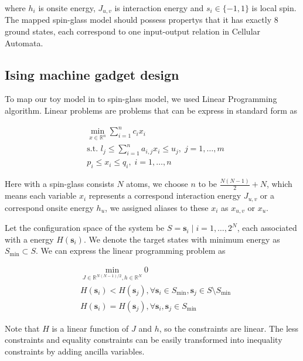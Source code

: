 \documentclass[twocolumn,superscriptaddress,english,showpacs,longbibliography]{revtex4-2}
\begin{document}
where $h_i$ is onsite energy, $J_{u,v}$ is interaction energy and
$s_i \in \{-1, 1\}$ is local spin. The mapped spin-glass model should
possess propertys that it has exactly 8 ground states, each correspond
to one input-output relation in Cellular Automata.

\subsection{Ising machine gadget design}\label{sec:gadget-design}
To map our toy model in  to
spin-glass model, we used Linear Programming algorithm.
Linear problems are problems that can be express in standard form as

\begin{equation}
    \begin{split}
        &\min_{x \in \mathbb{R}^n} \sum_{i=1}^n c_ix_i\\
        &\text{s.t. } l_j \leq \sum_{i=1}^n a_{i,j}x_i \leq u_j, \; j=1,\ldots,m\\
        &p_i \leq x_i \leq q_i, \; i=1,\ldots, n
    \end{split}
\end{equation}

Here with a spin-glass consists $N$ atoms, we choose $n$ to be
$\frac{N(N-1)}{2} + N$, which means each variable $x_i$ represents a
correspond interaction energy $J_{u, v}$ or a correspond onsite energy
$h_u$, we assigned aliases to these $x_i$ as $x_{u,v}$ or
$x_{u}$.

Let the configuration space of the system be
$S = {\mathbf s_i\mid i=1,\ldots, 2^N}$, each associated with a
energy $H(\mathbf s_i)$. We denote the target states with minimum
energy as $S_{\text{min}} \subset S$. We can express the linear
programming problem as

\begin{equation}
    \begin{split}
        &\min_{J \in \mathbb{R}^{N(N{-}1)/2}, h\in \mathbb{R}^N} 0\\
        &H(\mathbf s_i) < H(\mathbf s_j), \forall \mathbf s_i \in S_{\text{min}}, \mathbf s_j \in S \setminus S_{\text{min}}\\
        &H(\mathbf s_i) = H(\mathbf s_j), \forall \mathbf s_i, \mathbf s_j \in S_{\text{min}}
    \end{split}
\end{equation}

Note that $H$ is a linear function of $J$ and $h$, so the
constraints are linear. The less constraints and equality constraints
can be easily transformed into inequality constraints by adding ancilla
variables.
\end{document}
